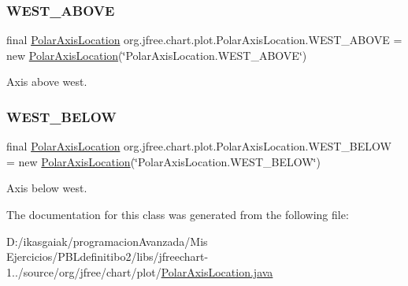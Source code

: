 \subsubsection{\texorpdfstring{W\+E\+S\+T\+\_\+\+A\+B\+O\+VE}{WEST\_ABOVE}}
{\footnotesize\ttfamily final \mbox{\hyperlink{classorg_1_1jfree_1_1chart_1_1plot_1_1_polar_axis_location}{Polar\+Axis\+Location}} org.\+jfree.\+chart.\+plot.\+Polar\+Axis\+Location.\+W\+E\+S\+T\+\_\+\+A\+B\+O\+VE = new \mbox{\hyperlink{classorg_1_1jfree_1_1chart_1_1plot_1_1_polar_axis_location}{Polar\+Axis\+Location}}(\char`\"{}Polar\+Axis\+Location.\+W\+E\+S\+T\+\_\+\+A\+B\+O\+VE\char`\"{})\hspace{0.3cm}{\ttfamily [static]}}

Axis above west. \mbox{\label{classorg_1_1jfree_1_1chart_1_1plot_1_1_polar_axis_location_a8506492e98d0c7c8b6680eb9c1b24907}} 
\subsubsection{\texorpdfstring{W\+E\+S\+T\+\_\+\+B\+E\+L\+OW}{WEST\_BELOW}}
{\footnotesize\ttfamily final \mbox{\hyperlink{classorg_1_1jfree_1_1chart_1_1plot_1_1_polar_axis_location}{Polar\+Axis\+Location}} org.\+jfree.\+chart.\+plot.\+Polar\+Axis\+Location.\+W\+E\+S\+T\+\_\+\+B\+E\+L\+OW = new \mbox{\hyperlink{classorg_1_1jfree_1_1chart_1_1plot_1_1_polar_axis_location}{Polar\+Axis\+Location}}(\char`\"{}Polar\+Axis\+Location.\+W\+E\+S\+T\+\_\+\+B\+E\+L\+OW\char`\"{})\hspace{0.3cm}{\ttfamily [static]}}

Axis below west. 

The documentation for this class was generated from the following file\+:\begin{DoxyCompactItemize}
\item 
D\+:/ikasgaiak/programacion\+Avanzada/\+Mis Ejercicios/\+P\+B\+Ldefinitibo2/libs/jfreechart-\/1../source/org/jfree/chart/plot/\mbox{\hyperlink{_polar_axis_location_8java}{Polar\+Axis\+Location.\+java}}\end{DoxyCompactItemize}
